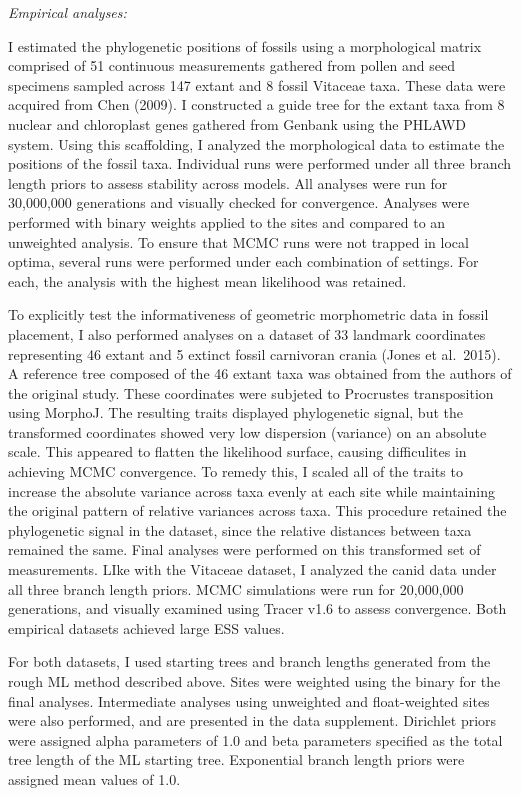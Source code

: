 \documentclass[12pt]{article}
\begin{document}
\emph{Empirical analyses:}

I estimated the phylogenetic positions of fossils using a morphological
matrix comprised of 51 continuous measurements gathered from pollen and
seed specimens sampled across 147 extant and 8 fossil Vitaceae taxa.
These data were acquired from Chen (2009). I constructed a guide tree
for the extant taxa from 8 nuclear and chloroplast genes gathered from
Genbank using the PHLAWD system. Using this scaffolding, I analyzed the
morphological data to estimate the positions of the fossil taxa.
Individual runs were performed under all three branch length priors to
assess stability across models. All analyses were run for 30,000,000
generations and visually checked for convergence. Analyses were
performed with binary weights applied to the sites and compared to an
unweighted analysis. To ensure that MCMC runs were not trapped in local
optima, several runs were performed under each combination of settings.
For each, the analysis with the highest mean likelihood was retained.

To explicitly test the informativeness of geometric morphometric data in
fossil placement, I also performed analyses on a dataset of 33 landmark
coordinates representing 46 extant and 5 extinct fossil carnivoran
crania (Jones et al.~2015). A reference tree composed of the 46 extant
taxa was obtained from the authors of the original study. These
coordinates were subjeted to Procrustes transposition using MorphoJ. The
resulting traits displayed phylogenetic signal, but the transformed
coordinates showed very low dispersion (variance) on an absolute scale.
This appeared to flatten the likelihood surface, causing difficulites in
achieving MCMC convergence. To remedy this, I scaled all of the traits
to increase the absolute variance across taxa evenly at each site while
maintaining the original pattern of relative variances across taxa. This
procedure retained the phylogenetic signal in the dataset, since the
relative distances between taxa remained the same. Final analyses were
performed on this transformed set of measurements. LIke with the
Vitaceae dataset, I analyzed the canid data under all three branch
length priors. MCMC simulations were run for 20,000,000 generations, and
visually examined using Tracer v1.6 to assess convergence. Both
empirical datasets achieved large ESS values.

For both datasets, I used starting trees and branch lengths generated
from the rough ML method described above. Sites were weighted using the
binary for the final analyses. Intermediate analyses using unweighted
and float-weighted sites were also performed, and are presented in the
data supplement. Dirichlet priors were assigned alpha parameters of 1.0
and beta parameters specified as the total tree length of the ML
starting tree. Exponential branch length priors were assigned mean
values of 1.0.
\end{document}
